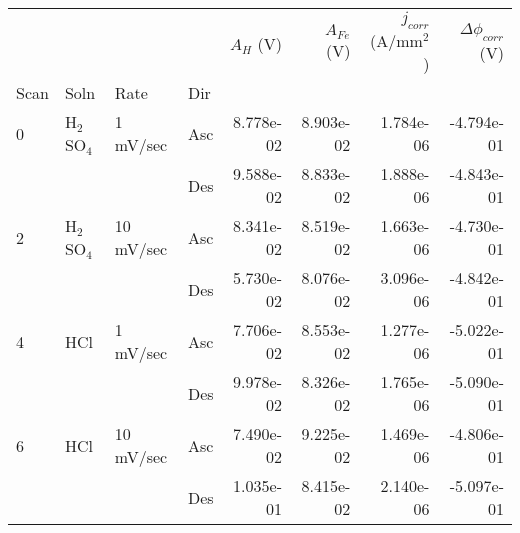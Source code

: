 \begin{tabular}{llllrrrr}
\toprule
  &     &           &     &  $A_H$ (V) &  $A_{Fe}$ (V) &  $j_{corr}$ (A/mm$^2$) &  $\Delta \phi_{corr}$ (V) \\
Scan & Soln & Rate & Dir &            &               &                        &                           \\
\midrule
0 & H$_2$SO$_4$ & 1 mV/sec & Asc &  8.778e-02 &     8.903e-02 &              1.784e-06 &                -4.794e-01 \\
  &     &           & Des &  9.588e-02 &     8.833e-02 &              1.888e-06 &                -4.843e-01 \\
2 & H$_2$SO$_4$ & 10 mV/sec & Asc &  8.341e-02 &     8.519e-02 &              1.663e-06 &                -4.730e-01 \\
  &     &           & Des &  5.730e-02 &     8.076e-02 &              3.096e-06 &                -4.842e-01 \\
4 & HCl & 1 mV/sec & Asc &  7.706e-02 &     8.553e-02 &              1.277e-06 &                -5.022e-01 \\
  &     &           & Des &  9.978e-02 &     8.326e-02 &              1.765e-06 &                -5.090e-01 \\
6 & HCl & 10 mV/sec & Asc &  7.490e-02 &     9.225e-02 &              1.469e-06 &                -4.806e-01 \\
  &     &           & Des &  1.035e-01 &     8.415e-02 &              2.140e-06 &                -5.097e-01 \\
\bottomrule
\end{tabular}

